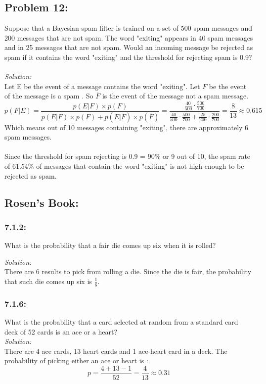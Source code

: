 \documentclass[a4paper]{article}
\begin{document}
	\subsection*{Problem 12:}
	Suppose that a Bayesian spam filter is trained on a set of 500 spam messages and 200 messages that are not spam. The word "exiting" appears in 40 spam messages and in 25 messages that are not spam. Would an incoming message be rejected as spam if it contains the word "exiting" and the threshold for rejecting spam is 0.9?\\\\
	\textit{Solution:}\\
	Let E be the event of a message contains the word "exiting". Let $F$ be the event of the message is a spam . So $\overline{F}$ is the event of the message not a spam message.
	\begin{equation*}
	    p(F|E) = \frac{p(E|F)\times p(F)}{p(E|F)\times p   (F) + p(E|\overline{F})\times p(\overline{F})} =\frac{\frac{40}{500}\cdot \frac{500}{700}}{\frac{40}{500}\cdot \frac{500}{700} + \frac{25}{200}\cdot \frac{200}{700}} =\frac{8}{13} \approx 0.615 
	\end{equation*}
	Which means out of 10 messages containing "exiting", there are approximately 6 spam messages.\\\\
	Since the threshold for spam rejecting is 0.9 = 90\% or 9 out of 10, the  spam rate of 61.54\% of messages that contain the word "exiting" is not high enough to be rejected as spam.
	\subsection*{Rosen's Book:}
	\subsubsection*{7.1.2:}
	What is the probability that a fair die comes up six when it is rolled?
	
	\emph{Solution: }\\
	There are 6 results to pick from rolling a die. Since the die is fair, the probability that such die comes up six is $\frac{1}{6}$.
	
	\subsubsection*{7.1.6:}
	What is the probability that a card selected at random from a standard card deck of 52 cards is an ace or a heart? \\
	\emph{Solution: }\\
	There are 4 ace cards, 13 heart cards and 1 ace-heart card in a deck. The probability of picking either an ace or heart is :
	\begin{equation*}
	    p = \frac{4+13-1}{52} = \frac{4}{13} \approx 0.31
	\end{equation*}
	
\end{document}
